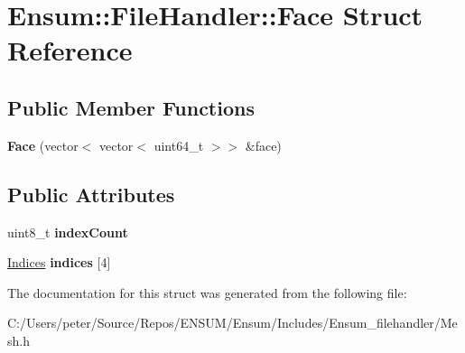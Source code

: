 \hypertarget{struct_ensum_1_1_file_handler_1_1_face}{}\section{Ensum\+:\+:File\+Handler\+:\+:Face Struct Reference}
\label{struct_ensum_1_1_file_handler_1_1_face}
\subsection*{Public Member Functions}
\begin{DoxyCompactItemize}
\item 
{\bfseries Face} (vector$<$ vector$<$ uint64\+\_\+t $>$$>$ \&face)\hypertarget{struct_ensum_1_1_file_handler_1_1_face_ac35968c5cc028647f3a0ab65b87ca7ce}{}\label{struct_ensum_1_1_file_handler_1_1_face_ac35968c5cc028647f3a0ab65b87ca7ce}

\end{DoxyCompactItemize}
\subsection*{Public Attributes}
\begin{DoxyCompactItemize}
\item 
uint8\+\_\+t {\bfseries index\+Count}\hypertarget{struct_ensum_1_1_file_handler_1_1_face_a2f54ed62b9413df72a60011724ed1ce6}{}\label{struct_ensum_1_1_file_handler_1_1_face_a2f54ed62b9413df72a60011724ed1ce6}

\item 
\hyperlink{struct_ensum_1_1_file_handler_1_1_indices}{Indices} {\bfseries indices} \mbox{[}4\mbox{]}\hypertarget{struct_ensum_1_1_file_handler_1_1_face_a50b3ad717679c1ff96f06192a191a48a}{}\label{struct_ensum_1_1_file_handler_1_1_face_a50b3ad717679c1ff96f06192a191a48a}

\end{DoxyCompactItemize}


The documentation for this struct was generated from the following file\+:\begin{DoxyCompactItemize}
\item 
C\+:/\+Users/peter/\+Source/\+Repos/\+E\+N\+S\+U\+M/\+Ensum/\+Includes/\+Ensum\+\_\+filehandler/Mesh.\+h\end{DoxyCompactItemize}
